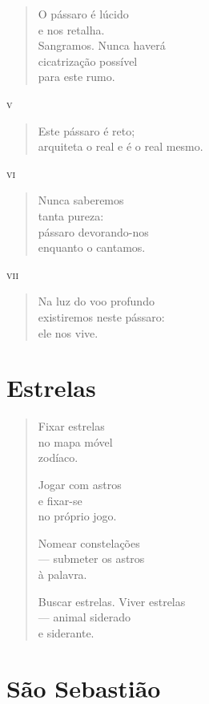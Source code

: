 \begin{verse}
O pássaro é lúcido\\
e nos retalha.\\
Sangramos. Nunca haverá\\
cicatrização possível\\
para este rumo.
\end{verse}

\medskip
\textsc{v}

\begin{verse}
Este pássaro é reto;\\
arquiteta o real e é o real mesmo.
\end{verse}

\medskip
\textsc{vi}

\begin{verse}
Nunca saberemos\\
tanta pureza:\\
pássaro devorando-nos\\
enquanto o cantamos.
\end{verse}

\medskip
\textsc{vii}

\begin{verse}
Na luz do voo profundo\\
existiremos neste pássaro:\\
ele nos vive.
\end{verse}

\chapter{Estrelas}

\begin{verse}
Fixar estrelas\\
no mapa móvel\\
zodíaco.

Jogar com astros\\
e fixar-se\\
no próprio jogo.

Nomear constelações\\
---  submeter os astros\\
à palavra.

Buscar estrelas. Viver estrelas\\
\hfill --- animal siderado\\
\hfill e siderante.
\end{verse}

\chapter{São Sebastião}

